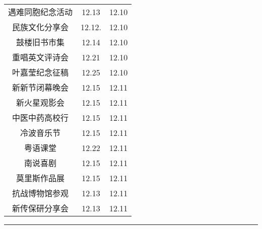 \documentclass[letterpaper, 12pt]{article}
\begin{document}
\begin{multicols}{2}
{\begin{longtable}{|c|c|c|}
    遇难同胞纪念活动 & 12.13 & 12.10\\
    民族文化分享会 & 12.12. & 12.10\\
    鼓楼旧书市集 & 12.14 & 12.10\\
    重唱英文评诗会 & 12.21 & 12.10\\
    叶嘉莹纪念征稿 & 12.25 & 12.10\\
    新新节闭幕晚会 & 12.15 & 12.11\\
    新火星观影会 & 12.15 & 12.11\\
    中医中药高校行 & 12.15 & 12.11\\
    冷波音乐节 & 12.15 & 12.11\\
    粤语课堂 & 12.22 & 12.11\\
    南说喜剧 & 12.15 & 12.11\\
    莫里斯作品展 & 12.15 & 12.11\\
    抗战博物馆参观 & 12.13 & 12.11\\
    新传保研分享会 & 12.13 & 12.11\\
    \hline
\end{longtable}
\unskip
\unpenalty
\unpenalty}\unvbox\colbbox
\end{multicols}
\hrule
\pagebreak
\end{document}
